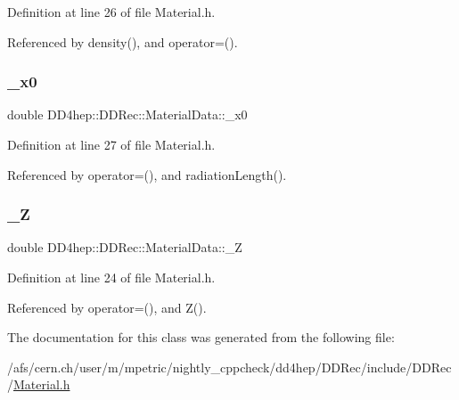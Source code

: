 Definition at line 26 of file Material.\+h.



Referenced by density(), and operator=().

\hypertarget{class_d_d4hep_1_1_d_d_rec_1_1_material_data_a187ecb221422fa7e4451cce49480cdca}{}\label{class_d_d4hep_1_1_d_d_rec_1_1_material_data_a187ecb221422fa7e4451cce49480cdca} 
\subsubsection{\texorpdfstring{\+\_\+x0}{\_x0}}
{\footnotesize\ttfamily double D\+D4hep\+::\+D\+D\+Rec\+::\+Material\+Data\+::\+\_\+x0\hspace{0.3cm}{\ttfamily [protected]}}



Definition at line 27 of file Material.\+h.



Referenced by operator=(), and radiation\+Length().

\hypertarget{class_d_d4hep_1_1_d_d_rec_1_1_material_data_acf48e4405aaa58e1255d41e49c0c956a}{}\label{class_d_d4hep_1_1_d_d_rec_1_1_material_data_acf48e4405aaa58e1255d41e49c0c956a} 
\subsubsection{\texorpdfstring{\+\_\+Z}{\_Z}}
{\footnotesize\ttfamily double D\+D4hep\+::\+D\+D\+Rec\+::\+Material\+Data\+::\+\_\+Z\hspace{0.3cm}{\ttfamily [protected]}}



Definition at line 24 of file Material.\+h.



Referenced by operator=(), and Z().



The documentation for this class was generated from the following file\+:\begin{DoxyCompactItemize}
\item 
/afs/cern.\+ch/user/m/mpetric/nightly\+\_\+cppcheck/dd4hep/\+D\+D\+Rec/include/\+D\+D\+Rec/\hyperlink{_material_8h}{Material.\+h}\end{DoxyCompactItemize}
